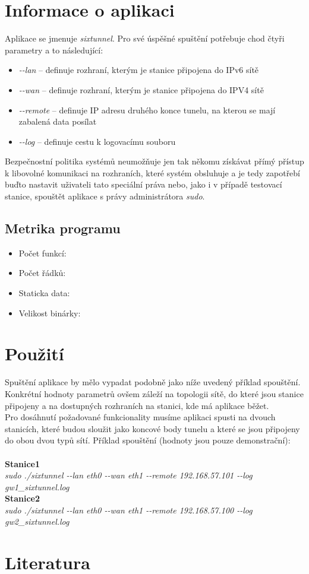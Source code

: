\documentclass[12pt,a4paper,onecolumn]{article}
\begin{document}
\section{Informace o aplikaci}
Aplikace se jmenuje {\it sixtunnel}. Pro své úspěšné spuštění potřebuje chod čtyři parametry a
to následující:
\begin{itemize}
    \item {\it \--\--lan} -- definuje rozhraní, kterým je stanice připojena do IPv6 sítě
    \item {\it \--\--wan} -- definuje rozhraní, kterým je stanice připojena do IPV4 sítě
    \item {\it \--\--remote} -- definuje IP adresu druhého konce tunelu, na kterou se mají
        zabalená data posílat
    \item {\it \--\--log} -- definuje cestu k logovacímu souboru
\end{itemize}
\indent Bezpečnostní politika systémů neumožňuje jen tak někomu získávat přímý přístup k libovolné
komunikaci na rozhraních, které systém obsluhuje a je tedy zapotřebí buďto nastavit uživateli tato
speciální práva nebo, jako i v případě testovací stanice, spouštět aplikace s právy administrátora
{\it sudo}.

\subsection{Metrika programu}
\begin{itemize}
    \item Počet funkcí: 
    \item Počet řádků: 
    \item Staticka data:  
    \item Velikost binárky: 
\end{itemize}

\section{Použití}
Spuštění aplikace by mělo vypadat podobně jako níže uvedený příklad spouštění. Konkrétní hodnoty
parametrů ovšem záleží na topologii sítě, do které jsou stanice připojeny a na dostupných
rozhraních na stanici, kde má aplikace běžet.\\
\indent Pro dosáhnutí požadované funkcionality musíme aplikaci spusti na dvouch stanicích,
které budou sloužit jako koncové body tunelu a které se jsou připojeny do obou dvou typů
sítí. Příklad spouštění (hodnoty jsou pouze demonstrační):\\ \\
\textbf{Stanice1} \\
{\it sudo ./sixtunnel \--\--lan eth0 \--\--wan eth1 \--\--remote 192.168.57.101 \--\--log gw1\_sixtunnel.log}\\
\textbf{Stanice2} \\
{\it sudo ./sixtunnel \--\--lan eth0 \--\--wan eth1 \--\--remote 192.168.57.100 \--\--log gw2\_sixtunnel.log}

\nocite{*}
\section{Literatura}
  
\end{document}
